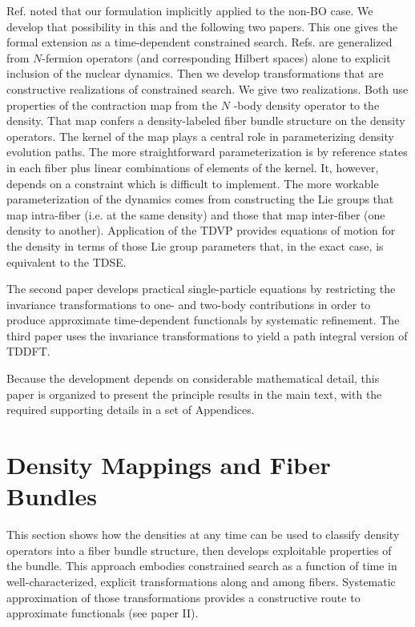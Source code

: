 \documentclass[aps,preprint]{revtex4}%
\begin{document}
Ref. \cite{BLWSBT99a} noted that our formulation implicitly applied to the
non-BO case. We develop that possibility in this and the following two papers.
This one gives the formal extension as a time-dependent constrained search.
Refs. \cite{BLWSBT99a,BLWSBT00a} are generalized from $N$-fermion operators
(and corresponding Hilbert spaces) alone to explicit inclusion of the nuclear
dynamics. Then we develop transformations that are constructive realizations
of constrained search. We give two realizations. Both use properties of the
contraction map from the $N$ -body density operator to the density. That map
confers a density-labeled fiber bundle structure on the density operators. The
kernel of the map plays a central role in parameterizing density evolution
paths. The more straightforward parameterization is by reference states in
each fiber plus linear combinations of elements of the kernel. It, however,
depends on a constraint which is difficult to implement. The more workable
parameterization of the dynamics comes from constructing the Lie groups that
map intra-fiber (i.e. at the same density) and those that map inter-fiber (one
density to another). Application of the TDVP provides equations of motion for
the density in terms of those Lie group parameters that, in the exact case, is
equivalent to the TDSE.

The second paper develops practical single-particle equations by restricting
the invariance transformations to one- and two-body contributions in order to
produce approximate time-dependent functionals by systematic refinement. The
third paper uses the invariance transformations to yield a path integral
version of TDDFT.

Because the development depends on considerable mathematical detail, this
paper is organized to present the principle results in the main text, with the
required supporting details in a set of Appendices.

\section{Density Mappings and Fiber Bundles}

\noindent This section shows how the densities at any time can be used to
classify density operators into a fiber bundle structure, then develops
exploitable properties of the bundle. This approach embodies constrained
search as a function of time in well-characterized, explicit transformations
along and among fibers. Systematic approximation of those transformations
provides a constructive route to approximate functionals (see paper II).
\end{document}
